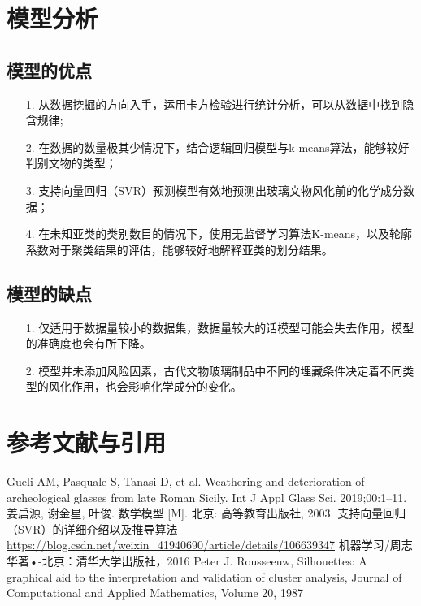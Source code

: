 \documentclass[withoutpreface,bwprint]{cumcmthesis}%
\begin{document}
	\section{模型分析}
	\subsection{模型的优点}
	\begin{itemize}
		\item[1.] 从数据挖掘的方向入手，运用卡方检验进行统计分析，可以从数据中找到隐含规律;
		\item[2.] 在数据的数量极其少情况下，结合逻辑回归模型与k-means算法，能够较好判别文物的类型；
		\item[3.] 支持向量回归（SVR）预测模型有效地预测出玻璃文物风化前的化学成分数据；
		\item[4.] 在未知亚类的类别数目的情况下，使用无监督学习算法K-means，以及轮廓系数对于聚类结果的评估，能够较好地解释亚类的划分结果。
	\end{itemize}
	
	\subsection{模型的缺点}
	\begin{itemize}
		\item[1.] 仅适用于数据量较小的数据集，数据量较大的话模型可能会失去作用，模型的准确度也会有所下降。
		\item[2.] 模型并未添加风险因素，古代文物玻璃制品中不同的埋藏条件决定着不同类型的风化作用，也会影响化学成分的变化。
	\end{itemize}
	
	
	
	
	
	\clearpage
	\section{参考文献与引用}
	\begin{thebibliography}{8}%
		Gueli AM, Pasquale S, Tanasi D, et al. Weathering and deterioration of archeological glasses from late Roman Sicily. Int J Appl Glass Sci. 2019;00:1–11. 
		姜启源, 谢金星, 叶俊. 数学模型 [M]. 北京: 高等教育出版社, 2003.
		支持向量回归（SVR）的详细介绍以及推导算法\url{https://blog.csdn.net/weixin_41940690/article/details/106639347}
		机器学习/周志华著•-北京：清华大学出版社，2016
		Peter J. Rousseeuw,
		Silhouettes: A graphical aid to the interpretation and validation of cluster analysis,
		Journal of Computational and Applied Mathematics,
		Volume 20,
		1987
	\end{thebibliography}
\end{document}
